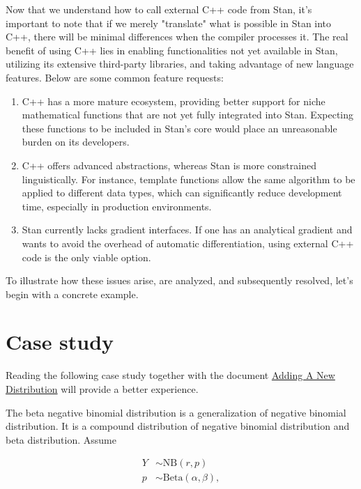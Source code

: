 \documentclass[11pt]{article}
\begin{document}
Now that we understand how to call external C++ code from Stan, it's important to note that if we merely "translate" what is possible in Stan into C++, there will be minimal differences when the compiler processes it. The real benefit of using C++ lies in enabling functionalities not yet available in Stan, utilizing its extensive third-party libraries, and taking advantage of new language features. Below are some common feature requests:

\begin{enumerate}
\item C++ has a more mature ecosystem, providing better support for niche mathematical functions that are not yet fully integrated into Stan. Expecting these functions to be included in Stan's core would place an unreasonable burden on its developers.
\item C++ offers advanced abstractions, whereas Stan is more constrained linguistically. For instance, template functions allow the same algorithm to be applied to different data types, which can significantly reduce development time, especially in production environments.
\item Stan currently lacks gradient interfaces. If one has an analytical gradient and wants to avoid the overhead of automatic differentiation, using external C++ code is the only viable option.
\end{enumerate}

To illustrate how these issues arise, are analyzed, and subsequently resolved, let's begin with a concrete example.








\section{Case study}

Reading the following case study together with the document \href{https://mc-stan.org/math/md_doxygen_2contributor__help__pages_2adding__new__distributions.html}{Adding A New Distribution} will provide a better experience.


The beta negative binomial distribution is a generalization of negative binomial distribution. It is a compound distribution of negative binomial distribution and beta distribution. Assume

\begin{equation*}
  \begin{aligned}
  Y &\sim \text{NB}(r,p) \\
  p &\sim {\textrm {Beta}}(\alpha ,\beta ),
  \end{aligned}
\end{equation*}
\end{document}
